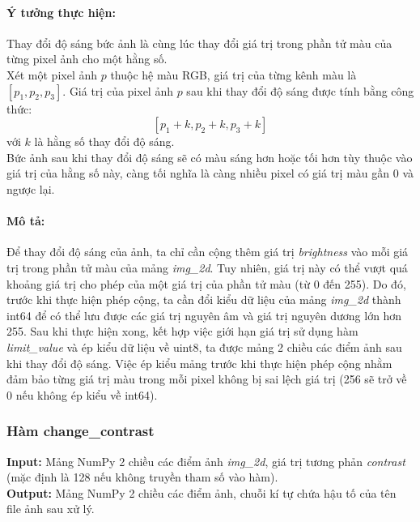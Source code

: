 \documentclass{article}
\begin{document}
\paragraph{Ý tưởng thực hiện:} Thay đổi độ sáng bức ảnh là cùng lúc thay đổi giá trị trong phần tử màu của từng pixel ảnh cho một hằng số. \\
Xét một pixel ảnh $p$ thuộc hệ màu RGB, giá trị của từng kênh màu là $[p_{1}, p_{2}, p_{3}]$. Giá trị của pixel ảnh $p$ sau khi thay đổi độ sáng được tính bằng công thức: 
\[[p_{1} + k , p_{2} + k, p_{3} + k]\]
với $k$ là hằng số thay đổi độ sáng. \\ Bức ảnh sau khi thay đổi độ sáng sẽ có màu sáng hơn hoặc tối hơn tùy thuộc vào giá trị của hằng số này, càng tối nghĩa là càng nhiều pixel có giá trị màu gần 0 và ngược lại.

\paragraph{Mô tả:} Để thay đổi độ sáng của ảnh, ta chỉ cần cộng thêm giá trị \textit{brightness} vào mỗi giá trị trong phần tử màu của mảng \textit{img\_2d}. Tuy nhiên, giá trị này có thể vượt quá khoảng giá trị cho phép của một giá trị của phần tử màu (từ 0 đến 255). Do đó, trước khi thực hiện phép cộng, ta cần đổi kiểu dữ liệu của mảng \textit{img\_2d} thành int64 để có thể lưu được các giá trị nguyên âm và giá trị nguyên dương lớn hơn 255. Sau khi thực hiện xong, kết hợp việc giới hạn giá trị sử dụng hàm \textit{limit\_value} và ép kiểu dữ liệu về uint8, ta được mảng 2 chiều các điểm ảnh sau khi thay đổi độ sáng. Việc ép kiểu mảng trước khi thực hiện phép cộng nhằm đảm bảo từng giá trị màu trong mỗi pixel không bị sai lệch giá trị (256 sẽ trở về 0 nếu không ép kiểu về int64).

\subsubsection{Hàm change\_contrast}
\textbf{Input:} Mảng NumPy 2 chiều các điểm ảnh \textit{img\_2d}, giá trị tương phản \textit{contrast} (mặc định là 128 nếu không truyền tham số vào hàm). \\
\textbf{Output:} Mảng NumPy 2 chiều các điểm ảnh, chuỗi kí tự chứa hậu tố của tên file ảnh sau xử lý.
\end{document}
